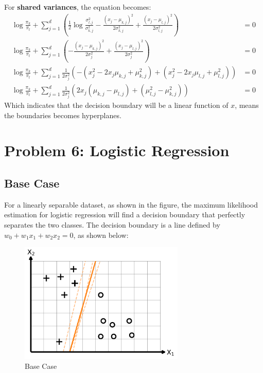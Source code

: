 \documentclass[11pt, a4paper, oneside]{memoir}
\begin{document}
For \textbf{shared variances}, the equation becomes:
\begin{align*}
  \log \frac{\pi_k}{\pi_l} + \sum_{j=1}^{d} \left( \frac{1}{2} \log \frac{\sigma^2_{l,j}}{\sigma^2_{k,j}} - \frac{(x_j - \mu_{k,j})^2}{2\sigma^2_{k,j}} + \frac{(x_j - \mu_{l,j})^2}{2\sigma^2_{l,j}} \right) &= 0 \\
  \log \frac{\pi_k}{\pi_l} + \sum_{j=1}^{d} \left( -\frac{(x_j - \mu_{k,j})^2}{2\sigma^2_{j}} + \frac{(x_j - \mu_{l,j})^2}{2\sigma^2_{j}} \right) &= 0 \\
  \log \frac{\pi_k}{\pi_l} + \sum_{j=1}^{d} \frac{1}{2\sigma^2_{j}} \left( -(x_j^2 - 2x_j\mu_{k,j} + \mu_{k,j}^2) + (x_j^2 - 2x_j\mu_{l,j} + \mu_{l,j}^2) \right) &= 0 \\
  \log \frac{\pi_k}{\pi_l} + \sum_{j=1}^{d} \frac{1}{2\sigma^2_{j}} \left( 2x_j(\mu_{k,j} - \mu_{l,j}) + (\mu_{l,j}^2 - \mu_{k,j}^2) \right) &= 0
\end{align*}
Which indicates that the decision boundary will be a linear function of $x$,
means the boundaries becomes hyperplanes.

\chapter{Problem 6: Logistic Regression}
\section{Base Case}
For a linearly separable dataset, as shown in the figure,
the maximum likelihood estimation for logistic regression will find a decision boundary that perfectly separates the two classes.
The decision boundary is a line defined by $w_0 + w_1x_1 + w_2x_2 = 0$, as shown below:

\begin{figure}[H]
  \centering
  \includegraphics[width=0.7\textwidth]{code/result/problem6_1.pdf}
  \caption{Base Case}
  \label{fig:problem6_1}
\end{figure}
\end{document}
